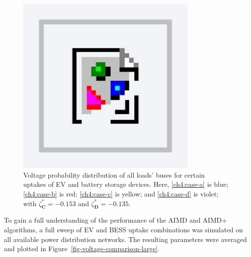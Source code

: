 \begin{figure}\centering
 \includegraphics[width=0.8\textwidth]{foo}
 \caption{Voltage probability distribution of all loads' buses for certain uptakes of EV and battery storage devices. Here, \ref{ch4:case-a} is blue; \ref{ch4:case-b} is red; \ref{ch4:case-c} is yellow; and \ref{ch4:case-d} is violet; with $\zeta_\textbf{C}^{*} = -0.153$ and $\zeta_\textbf{D}^{*}=-0.135$.}
 \label{fig-voltage-violation-excerpt}
\end{figure}

To gain a full understanding of the performance of the AIMD and AIMD+ algorithms, a full sweep of EV and BESS uptake combinations was simulated on all available power distribution networks. The resulting parameters were averaged and plotted in Figure~\ref{fig-voltage-comparison-large}.
\vspace{-12pt}


